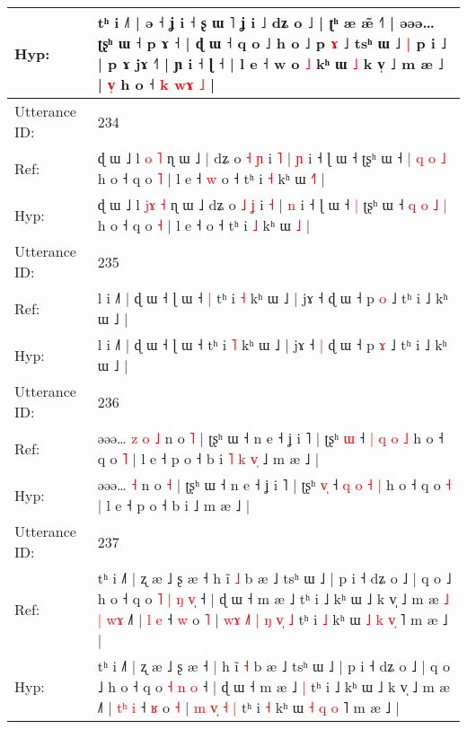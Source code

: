 \documentclass[10pt]{article}
\DeclareRobustCommand{\hl}[1]{{\textcolor{red}{#1}}}
\begin{document}
\begin{longtable}{ll}
 \\
Hyp: & tʰ i ˩˥ | ə ˧ ʝ i ˧ ʂ ɯ ˥ ʝ i ˩ dʑ o ˩ | ʈʰ æ æ̃ ˧\hl{˥} | əəə… ʈʂʰ ɯ ˧\hl{}\hl{} p\hl{}\hl{}\hl{}\hl{} \hl{}ɤ ˧\hl{} | ɖ ɯ ˧ q o ˩ h o ˩ p \hl{ɤ} ˩ tsʰ ɯ ˩\hl{ }\hl{|} p i ˩ | p ɤ\hl{}\hl{} jɤ ˧˥ | ɲ i ˧ ɭ\hl{}\hl{} ˧ | l e ˧ w o \hl{˩} kʰ ɯ \hl{˩} k v̩ ˩ m æ ˩ |\hl{}\hl{} \hl{}\hl{v}\hl{̩} h o ˧ \hl{k} \hl{w}\hl{ɤ} \hl{˩} |
 \\
\midrule
Utterance ID: & 234 \\
Ref: & ɖ ɯ ˩ l \hl{}\hl{o} \hl{˥} ɳ ɯ ˩\hl{ }\hl{|} dʑ o \hl{˧} \hl{ɲ} i \hl{˥} | \hl{ɲ} i ˧ ɭ ɯ ˧\hl{}\hl{} ʈʂʰ ɯ ˧ \hl{|} \hl{q} \hl{o} \hl{˩} h o ˧ q o \hl{˥} | l e ˧\hl{ }\hl{w} o ˧ tʰ i \hl{˧} kʰ ɯ \hl{˧}\hl{˥} |
 \\
Hyp: & ɖ ɯ ˩ l \hl{j}\hl{ɤ} \hl{˧} ɳ ɯ ˩\hl{}\hl{} dʑ o \hl{˩} \hl{ʝ} i \hl{˧} | \hl{n} i ˧ ɭ ɯ ˧\hl{ }\hl{|} ʈʂʰ ɯ ˧ \hl{q} \hl{o} \hl{˩} \hl{|} h o ˧ q o \hl{˧} | l e ˧\hl{}\hl{} o ˧ tʰ i \hl{˩} kʰ ɯ \hl{}\hl{˩} |
 \\
\midrule
Utterance ID: & 235 \\
Ref: & l i ˩˥ | ɖ ɯ ˧ ɭ ɯ ˧\hl{ }\hl{|} tʰ i \hl{˧} kʰ ɯ ˩ | jɤ ˧\hl{}\hl{} ɖ ɯ ˧ p \hl{o} ˩ tʰ i ˩ kʰ ɯ ˩ |
 \\
Hyp: & l i ˩˥ | ɖ ɯ ˧ ɭ ɯ ˧\hl{}\hl{} tʰ i \hl{˥} kʰ ɯ ˩ | jɤ ˧\hl{ }\hl{|} ɖ ɯ ˧ p \hl{ɤ} ˩ tʰ i ˩ kʰ ɯ ˩ |
 \\
\midrule
Utterance ID: & 236 \\
Ref: & əəə…\hl{ }\hl{z}\hl{ }\hl{o} \hl{˩} n o \hl{˥} | ʈʂʰ ɯ ˧ n e ˧ ʝ i ˥ | ʈʂʰ \hl{}\hl{ɯ} ˧ \hl{|} \hl{q} \hl{o} \hl{˩} h o ˧ q o \hl{˥} | l e ˧ p o ˧ b i\hl{ }\hl{˥}\hl{ }\hl{k}\hl{ }\hl{v}\hl{̩} ˩ m æ ˩ |
 \\
Hyp: & əəə…\hl{}\hl{}\hl{}\hl{} \hl{˧} n o \hl{˧} | ʈʂʰ ɯ ˧ n e ˧ ʝ i ˥ | ʈʂʰ \hl{v}\hl{̩} ˧ \hl{q} \hl{o} \hl{˧} \hl{|} h o ˧ q o \hl{˧} | l e ˧ p o ˧ b i\hl{}\hl{}\hl{}\hl{}\hl{}\hl{}\hl{} ˩ m æ ˩ |
 \\
\midrule
Utterance ID: & 237 \\
Ref: & tʰ i ˩˥ | ʐ æ ˩ ʂ æ ˧\hl{}\hl{} h ĩ \hl{˩} b æ ˩ tsʰ ɯ ˩ | p i ˧ dʑ o ˩ | q o ˩ h o ˧ q o\hl{ }\hl{˥} \hl{|} \hl{ŋ} \hl{v}\hl{̩} ˧ | ɖ ɯ ˧ m æ ˩\hl{}\hl{} tʰ i ˩ kʰ ɯ ˩ k v̩ ˩ m æ\hl{ }\hl{˩}\hl{ }\hl{|}\hl{ }\hl{w}\hl{ɤ} ˩˥ | \hl{}\hl{l} \hl{e} ˧ \hl{w} o \hl{˥} |\hl{ }\hl{w}\hl{ɤ} \hl{˩}\hl{˥} \hl{|}\hl{ }\hl{ŋ} \hl{v}\hl{̩} \hl{˩} tʰ i \hl{˩} kʰ ɯ \hl{˩} \hl{k} \hl{v}\hl{̩} ˥ m æ ˩ |
 \\
Hyp: & tʰ i ˩˥ | ʐ æ ˩ ʂ æ ˧\hl{ }\hl{|} h ĩ \hl{˧} b æ ˩ tsʰ ɯ ˩ | p i ˧ dʑ o ˩ | q o ˩ h o ˧ q o\hl{}\hl{} \hl{˧} \hl{n} \hl{}\hl{o} ˧ | ɖ ɯ ˧ m æ ˩\hl{ }\hl{|} tʰ i ˩ kʰ ɯ ˩ k v̩ ˩ m æ\hl{}\hl{}\hl{}\hl{}\hl{}\hl{}\hl{} ˩˥ | \hl{t}\hl{ʰ} \hl{i} ˧ \hl{ʁ} o \hl{˧} |\hl{}\hl{}\hl{} \hl{}\hl{m} \hl{}\hl{v}\hl{̩} \hl{}\hl{˧} \hl{|} tʰ i \hl{˧} kʰ ɯ \hl{˧} \hl{q} \hl{}\hl{o} ˥ m æ ˩ |

\end{longtable}
\end{document}
